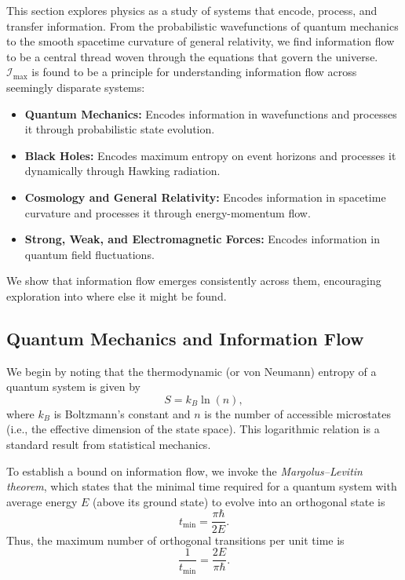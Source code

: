 \documentclass[12pt]{article}
\begin{document}
This section explores physics as a study of systems that encode, process, and transfer information. From the probabilistic wavefunctions of quantum mechanics to the smooth spacetime curvature of general relativity, we find information flow to be a central thread woven through the equations that govern the universe. \(\mathcal{I}_{\text{max}}\) is found to be a principle for understanding information flow across seemingly disparate systems:
\begin{itemize}
    \item \textbf{Quantum Mechanics:} Encodes information in wavefunctions and processes it through probabilistic state evolution.
    \item \textbf{Black Holes:} Encodes maximum entropy on event horizons and processes it dynamically through Hawking radiation.
    \item \textbf{Cosmology and General Relativity:} Encodes information in spacetime curvature and processes it through energy-momentum flow.
    \item \textbf{Strong, Weak, and Electromagnetic Forces:} Encodes information in quantum field fluctuations.
\end{itemize}
We show that information flow emerges consistently across them, encouraging exploration into where else it might be found.


\subsection{Quantum Mechanics and Information Flow}

We begin by noting that the thermodynamic (or von Neumann) entropy of a quantum system is given by
\begin{equation}
    S = k_B \ln(n),
\end{equation}
where \( k_B \) is Boltzmann’s constant and \( n \) is the number of accessible microstates (i.e., the effective dimension of the state space). This logarithmic relation is a standard result from statistical mechanics.

To establish a bound on information flow, we invoke the \textit{Margolus–Levitin theorem}, which states that the minimal time required for a quantum system with average energy \( E \) (above its ground state) to evolve into an orthogonal state is
\begin{equation}
    t_{\min} = \frac{\pi \hbar}{2E}.
\end{equation}
Thus, the maximum number of orthogonal transitions per unit time is
\begin{equation}
    \frac{1}{t_{\min}} = \frac{2E}{\pi \hbar}.
\end{equation}
\end{document}
